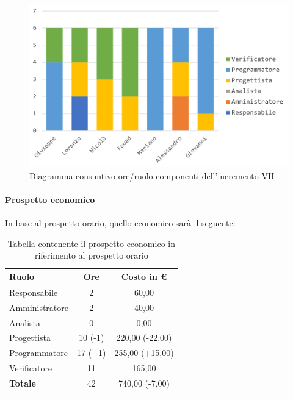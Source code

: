 		\begin{figure}[H]
			\centering
			\includegraphics[width=0.8\linewidth]{images/consuntivo/ConsIncr7-1.png}
			\caption{Diagramma consuntivo ore/ruolo componenti dell'incremento VII}
			\label{fig:consuntivo diagramma suddivisione ruoli incremento VII}
		\end{figure}
		
		\paragraph{Prospetto economico}
		In base al prospetto orario, quello economico sarà il seguente: 
		
		\begin{longtable}{|l|c|c|}
			\hline
			\rowcolor{lighter-grayer}
			\textbf{Ruolo} & \textbf{Ore} & \textbf{Costo in € } \\
			\hline
			\endfirsthead
			
			\hline
			Responsabile 	    & 2 & 60,00\\
			\hline 
			\hline
			Amministratore	   & 2 & 40,00\\
			\hline
			\hline
			Analista 				 & 0 & 0,00\\
			\hline
			\hline
			Progettista 		   & 10 (-1) & 220,00 (-22,00)\\
			\hline
			\hline
			Programmatore 	  & 17 (+1) & 255,00 (+15,00)\\
			\hline
			\hline
			Verificatore 		   & 11 & 165,00\\
			\hline
			\textbf{Totale} 	 & 42 & 740,00 (-7,00)\\
			\hline
			\caption{Tabella contenente il prospetto economico in riferimento al prospetto orario}
		\end{longtable}
	
		\pagebreak
		
